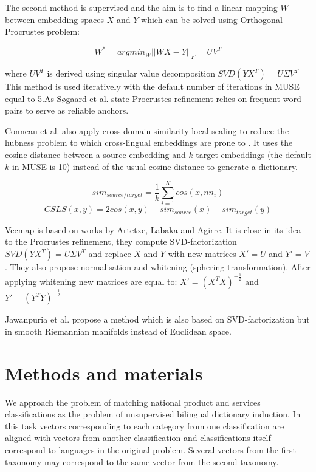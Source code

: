\documentclass[conference]{IEEEtran}
\begin{document}
The second method is supervised and the aim is to find a linear mapping $W$ between embedding spaces $X$ and $Y$ which can be solved using Orthogonal Procrustes problem:

$$ W^* = argmin_W ||WX - Y||_F = UV^T$$

where $UV^T$ is derived using singular value decomposition $SVD(YX^T) = U \Sigma V^T$
This method is used iteratively with the default number of iterations in MUSE equal to 5.As Søgaard et al. state Procrustes refinement relies on frequent word pairs to serve as reliable anchors.

Conneau et al. also apply cross-domain similarity local scaling to reduce the hubness problem to which cross-lingual embeddings are prone to \cite{dinu}. It uses the cosine distance between a source embedding and $k$-target embeddings (the default $k$ in MUSE is 10) instead of the usual cosine distance to generate a dictionary.

$$sim_{source/target} = \dfrac{1}{k}\sum_{i=1}^Kcos(x, nn_i)$$
$$CSLS(x,y) = 2cos(x,y) - sim_{source}(x)  - sim_{target}(y)$$

Vecmap is based on works by Artetxe, Labaka and Agirre. It is close in its idea to the Procrustes refinement, they compute SVD-factorization $SVD(YX^T) = U\Sigma V^T$ and replace $X$ and $Y$ with new matrices $X' = U$ and $Y' = V$. They also propose normalisation and whitening (sphering transformation). After applying whitening new matrices are equal to:
$X' = (X^TX)^{-\tfrac{1}{2}}$ and $Y' = (Y^TY)^{-\tfrac{1}{2}}$

Jawanpuria et al. \cite{jawanpuria} propose a method which is also based on SVD-factorization but in smooth Riemannian manifolds instead of Euclidean space.

\section{Methods and materials}

We approach the problem of matching national product and services classifications as the problem of unsupervised bilingual dictionary induction. In this task vectors corresponding to each category from one classification are aligned with vectors from another classification and classifications itself correspond to languages in the original problem. Several vectors from the first taxonomy may correspond to the same vector from the second taxonomy.
\end{document}
